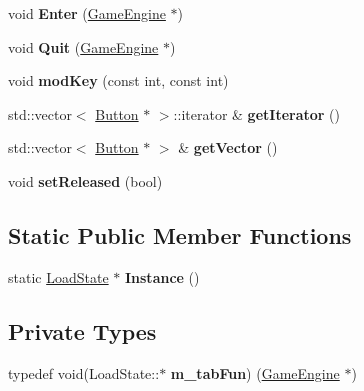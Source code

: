 \begin{DoxyCompactItemize}
\item 
\hypertarget{class_load_state_a043ef4993bba42fb3719aa4cd532fa8a}{}void {\bfseries Enter} (\hyperlink{class_game_engine}{Game\+Engine} $\ast$)\label{class_load_state_a043ef4993bba42fb3719aa4cd532fa8a}

\item 
\hypertarget{class_load_state_a1ac5bde257c8711d8032b25bd08bb746}{}void {\bfseries Quit} (\hyperlink{class_game_engine}{Game\+Engine} $\ast$)\label{class_load_state_a1ac5bde257c8711d8032b25bd08bb746}

\item 
\hypertarget{class_load_state_a3139d19dabbf28bec84b404623428376}{}void {\bfseries mod\+Key} (const int, const int)\label{class_load_state_a3139d19dabbf28bec84b404623428376}

\item 
\hypertarget{class_load_state_a792715f9086994630de81e5709ea4842}{}std\+::vector$<$ \hyperlink{class_button}{Button} $\ast$ $>$\+::iterator \& {\bfseries get\+Iterator} ()\label{class_load_state_a792715f9086994630de81e5709ea4842}

\item 
\hypertarget{class_load_state_aeac5922f9d75554fb30c37e91a98f203}{}std\+::vector$<$ \hyperlink{class_button}{Button} $\ast$ $>$ \& {\bfseries get\+Vector} ()\label{class_load_state_aeac5922f9d75554fb30c37e91a98f203}

\item 
\hypertarget{class_load_state_aee9996a9b6631f3ee237d63790750e91}{}void {\bfseries set\+Released} (bool)\label{class_load_state_aee9996a9b6631f3ee237d63790750e91}

\end{DoxyCompactItemize}
\subsection*{Static Public Member Functions}
\begin{DoxyCompactItemize}
\item 
\hypertarget{class_load_state_a06f181db937ed45b3ea79bf2f0484c88}{}static \hyperlink{class_load_state}{Load\+State} $\ast$ {\bfseries Instance} ()\label{class_load_state_a06f181db937ed45b3ea79bf2f0484c88}

\end{DoxyCompactItemize}
\subsection*{Private Types}
\begin{DoxyCompactItemize}
\item 
\hypertarget{class_load_state_ad5290dabf7b28ac3980ce69d92a1048a}{}typedef void(Load\+State\+::$\ast$ {\bfseries m\+\_\+tab\+Fun}) (\hyperlink{class_game_engine}{Game\+Engine} $\ast$)\label{class_load_state_ad5290dabf7b28ac3980ce69d92a1048a}

\end{DoxyCompactItemize}
